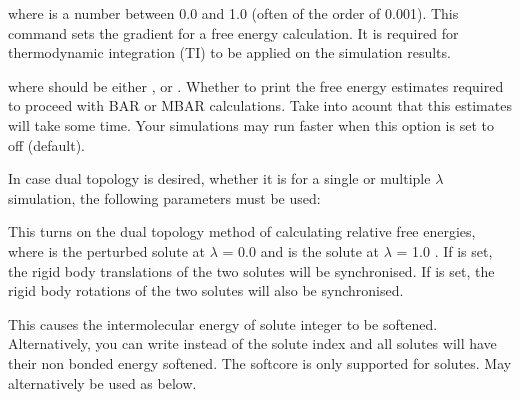 \documentclass[letterpaper,10pt,english]{sphinxmanual}
\begin{document}
where  is a number between 0.0 and 1.0 (often of the order of 0.001). This command sets the gradient for a free energy calculation. It is required for thermodynamic integration (TI) to be applied on the simulation results.

\ignorespaces 
\def\sphinxLiteralBlockLabel{\label{\detokenize{protoms:index-52}}}
%
\begin{sphinxVerbatim}[commandchars=\\\{\}]
 
\end{sphinxVerbatim}

where  should be either ,  or . Whether to print the free energy estimates required to proceed with BAR or MBAR calculations. Take into acount that this estimates will take some time. Your simulations may run faster when this option is set to off (default).

In case dual topology is desired, whether it is for a single or multiple \(\lambda\) simulation, the following parameters must be used:

%
\begin{sphinxVerbatim}[commandchars=\\\{\}]
    
\end{sphinxVerbatim}

This turns on the dual topology method of calculating relative free energies, where  is the perturbed solute at \(\lambda\) = 0.0 and  is the solute at \(\lambda\) = 1.0 . If  is set, the rigid body translations of the two solutes will be synchronised. If  is set, the rigid body rotations of the two solutes will also be synchronised.

\ignorespaces 
\def\sphinxLiteralBlockLabel{\label{\detokenize{protoms:index-53}}}
%
\begin{sphinxVerbatim}[commandchars=\\\{\}]
  
\end{sphinxVerbatim}

This causes the intermolecular energy of solute integer to be softened. Alternatively, you can write  instead of the solute index and all solutes will have their non bonded energy softened. The softcore is only supported for solutes. May alternatively be used as below.
\end{document}

